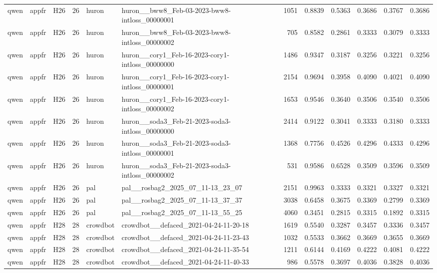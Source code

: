 \begin{table}[tbp]
\begin{tabular}{lllrllrrrrrr}
qwen & appfr & H26 & 26 & huron & huron\_\_bww8\_Feb-03-2023-bww8-intloss\_00000001 & 1051 & 0.8839 & 0.5363 & 0.3686 & 0.3767 & 0.3686 \\
qwen & appfr & H26 & 26 & huron & huron\_\_bww8\_Feb-03-2023-bww8-intloss\_00000002 & 705 & 0.8582 & 0.2861 & 0.3333 & 0.3079 & 0.3333 \\
qwen & appfr & H26 & 26 & huron & huron\_\_cory1\_Feb-16-2023-cory1-intloss\_00000000 & 1486 & 0.9347 & 0.3187 & 0.3256 & 0.3221 & 0.3256 \\
qwen & appfr & H26 & 26 & huron & huron\_\_cory1\_Feb-16-2023-cory1-intloss\_00000001 & 2154 & 0.9694 & 0.3958 & 0.4090 & 0.4021 & 0.4090 \\
qwen & appfr & H26 & 26 & huron & huron\_\_cory1\_Feb-16-2023-cory1-intloss\_00000002 & 1653 & 0.9546 & 0.3640 & 0.3506 & 0.3540 & 0.3506 \\
qwen & appfr & H26 & 26 & huron & huron\_\_soda3\_Feb-21-2023-soda3-intloss\_00000000 & 2414 & 0.9122 & 0.3041 & 0.3333 & 0.3180 & 0.3333 \\
qwen & appfr & H26 & 26 & huron & huron\_\_soda3\_Feb-21-2023-soda3-intloss\_00000001 & 1368 & 0.7756 & 0.4526 & 0.4296 & 0.4333 & 0.4296 \\
qwen & appfr & H26 & 26 & huron & huron\_\_soda3\_Feb-21-2023-soda3-intloss\_00000002 & 531 & 0.9586 & 0.6528 & 0.3509 & 0.3596 & 0.3509 \\
qwen & appfr & H26 & 26 & pal & pal\_\_rosbag2\_2025\_07\_11-13\_23\_07 & 2151 & 0.9963 & 0.3333 & 0.3321 & 0.3327 & 0.3321 \\
qwen & appfr & H26 & 26 & pal & pal\_\_rosbag2\_2025\_07\_11-13\_37\_37 & 3038 & 0.6458 & 0.3675 & 0.3369 & 0.2799 & 0.3369 \\
qwen & appfr & H26 & 26 & pal & pal\_\_rosbag2\_2025\_07\_11-13\_55\_25 & 4060 & 0.3451 & 0.2815 & 0.3315 & 0.1892 & 0.3315 \\
qwen & appfr & H28 & 28 & crowdbot & crowdbot\_\_defaced\_2021-04-24-11-20-18 & 1619 & 0.5540 & 0.3287 & 0.3457 & 0.3336 & 0.3457 \\
qwen & appfr & H28 & 28 & crowdbot & crowdbot\_\_defaced\_2021-04-24-11-23-43 & 1032 & 0.5533 & 0.3662 & 0.3669 & 0.3655 & 0.3669 \\
qwen & appfr & H28 & 28 & crowdbot & crowdbot\_\_defaced\_2021-04-24-11-35-54 & 1211 & 0.6144 & 0.4169 & 0.4222 & 0.4081 & 0.4222 \\
qwen & appfr & H28 & 28 & crowdbot & crowdbot\_\_defaced\_2021-04-24-11-40-33 & 986 & 0.5578 & 0.3697 & 0.4036 & 0.3828 & 0.4036 \\

\end{tabular}
\end{table}
